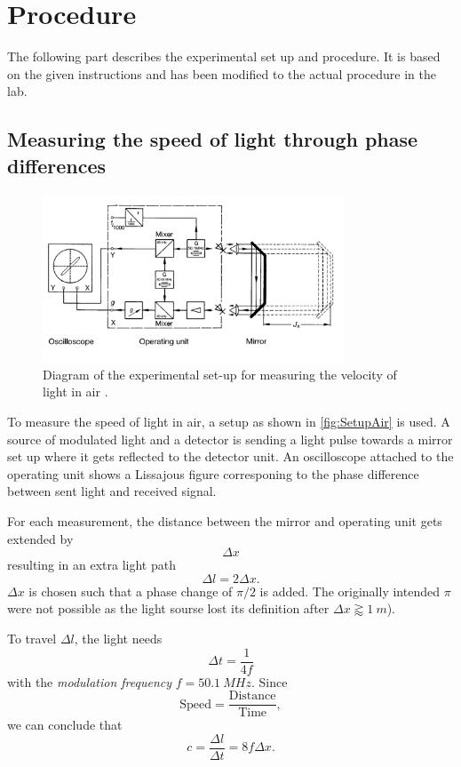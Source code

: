\section{Procedure}
\label{sec:procedure}
The following part describes the experimental set up and procedure. It is based on the given
instructions and has been modified to the actual procedure in the lab.

\subsection{Measuring the speed of light through phase differences}
\label{sec:measuring}
\begin{figure}
    \centering
    \includegraphics[width=0.8\textwidth]{media/Setup Air.png}
    \caption{Diagram of the experimental set-up for measuring the velocity of light in air
              \cite{LabInstructions}.}
    \label{fig:SetupAir}
\end{figure}
To measure the speed of light in air, a setup as shown in \autoref{fig:SetupAir} is used. A source
of modulated light and a detector is sending a light pulse towards a mirror set up where it gets
reflected to the detector unit. An oscilloscope attached to the operating unit shows a Lissajous
figure corresponing to the phase difference between sent light and received signal.

For each measurement, the distance between the mirror and operating unit gets extended by
\[
\Delta x
\]
resulting in an extra light path
\[
  \Delta l = 2 \Delta x.
\]
$\Delta x$ is chosen such that a phase change of $\pi / 2$ is added. The originally intended $\pi$
were not possible as the light sourse lost its definition after $\Delta x \gtrapprox \SI{1}{m}$).

To travel $\Delta l$, the light needs 
\[
  \Delta t = \frac{1}{4f}
\]
with the \textit{modulation frequency} $f = \SI{50.1}{MHz}$. Since
\[
  \text{Speed} = \frac{\text{Distance}}{\text{Time}},
\]
we can conclude that
\[
  c = \frac{\Delta l}{\Delta t} = 8f \Delta x.
\]


